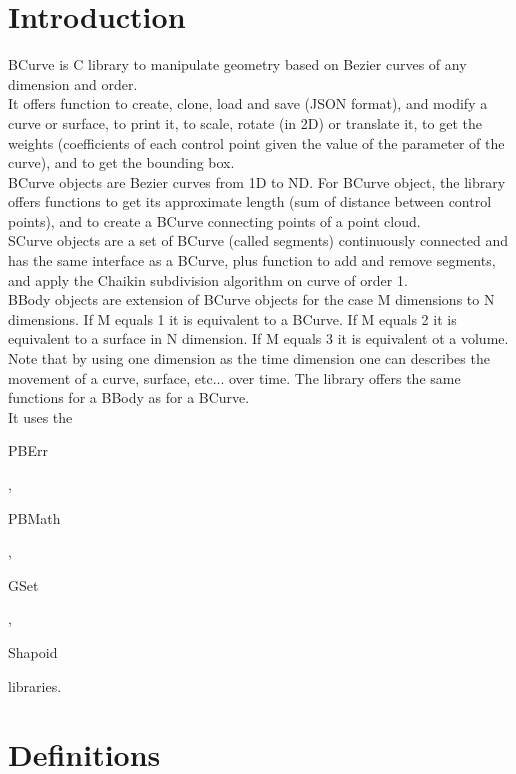 \section*{Introduction}

BCurve is C library to manipulate geometry based on Bezier curves of any dimension and order.\\ 

It offers function to create, clone, load and save (JSON format), and modify a curve or surface, to print it, to scale, rotate (in 2D) or translate it, to get the weights (coefficients of each control point given the value of the parameter of the curve), and to get the bounding box.\\ 

BCurve objects are Bezier curves from 1D to ND. For BCurve object, the library offers functions to get its approximate length (sum of distance between control points), and to create a BCurve connecting points of a point cloud.\\

SCurve objects are a set of BCurve (called segments) continuously connected and has the same interface as a BCurve, plus function to add and remove segments, and apply the Chaikin subdivision algorithm on curve of order 1.\\

BBody objects are extension of BCurve objects for the case M dimensions to N dimensions. If M equals 1 it is equivalent to a BCurve. If M equals 2 it is equivalent to a surface in N dimension. If M equals 3 it is equivalent ot a volume. Note that by using one dimension as the time dimension one can describes the movement of a curve, surface, etc... over time. The library offers the same functions for a BBody as for a BCurve.\\ 

It uses the \begin{ttfamily}PBErr\end{ttfamily}, \begin{ttfamily}PBMath\end{ttfamily}, \begin{ttfamily}GSet\end{ttfamily}, \begin{ttfamily}Shapoid\end{ttfamily} libraries.\\

\section{Definitions}

